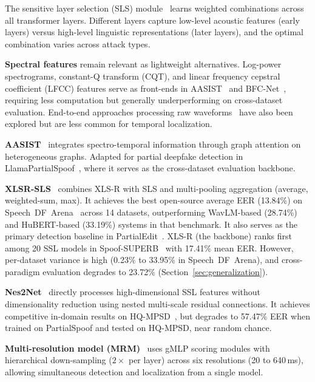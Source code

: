 \documentclass[journal]{IEEEtran}
\begin{document}
The sensitive layer selection (SLS) module~\cite{zhang2024xlrsls} learns weighted combinations across all transformer layers. Different layers capture low-level acoustic features (early layers) versus high-level linguistic representations (later layers), and the optimal combination varies across attack types.

\textbf{Spectral features} remain relevant as lightweight alternatives. Log-power spectrograms, constant-Q transform (CQT), and linear frequency cepstral coefficient (LFCC) features serve as front-ends in AASIST~\cite{jung2022aasist} and BFC-Net~\cite{zhou2025bfcnet}, requiring less computation but generally underperforming on cross-dataset evaluation. End-to-end approaches processing raw waveforms~\cite{tak2021rawnet2} have also been explored but are less common for temporal localization.

\textbf{AASIST}~\cite{jung2022aasist} integrates spectro-temporal information through graph attention on heterogeneous graphs. Adapted for partial deepfake detection in LlamaPartialSpoof~\cite{luong2025llamapartialspoof}, where it serves as the cross-dataset evaluation backbone.

\textbf{XLSR-SLS}~\cite{zhang2024xlrsls} combines XLS-R with SLS and multi-pooling aggregation (average, weighted-sum, max). It achieves the best open-source average EER (13.84\%) on Speech~DF~Arena~\cite{speechdfarena2025} across 14 datasets, outperforming WavLM-based (28.74\%) and HuBERT-based (33.19\%) systems in that benchmark. It also serves as the primary detection baseline in PartialEdit~\cite{zhang2025partialedit}. XLS-R (the backbone) ranks first among 20 SSL models in Spoof-SUPERB~\cite{ali2026spoofsuperb} with 17.41\% mean EER. However, per-dataset variance is high (0.23\% to 33.95\% in Speech~DF~Arena), and cross-paradigm evaluation degrades to 23.72\% (Section~\ref{sec:generalization}).

\textbf{Nes2Net}~\cite{liu2025nes2net} directly processes high-dimensional SSL features without dimensionality reduction using nested multi-scale residual connections. It achieves competitive in-domain results on HQ-MPSD~\cite{li2025hqmpsd}, but degrades to 57.47\% EER when trained on PartialSpoof and tested on HQ-MPSD, near random chance.

\textbf{Multi-resolution model (MRM)}~\cite{zhang2023partialspoof} uses gMLP scoring modules with hierarchical down-sampling ($2\times$ per layer) across six resolutions (20 to 640\,ms), allowing simultaneous detection and localization from a single model.
\end{document}
